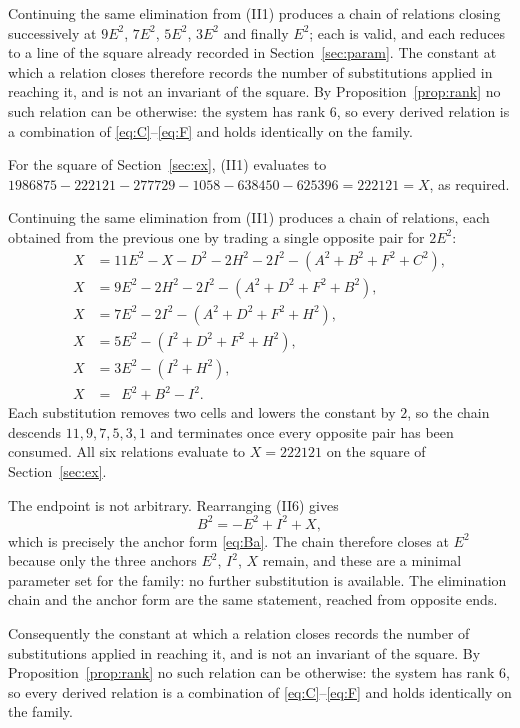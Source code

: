 \documentclass[12pt]{article}
\theoremstyle{remark}
\begin{document}
Continuing the same elimination from (II1) produces a chain of
relations closing successively at $9E^2$, $7E^2$, $5E^2$, $3E^2$ and
finally $E^2$; each is valid, and each reduces to a line of the square
already recorded in Section~\ref{sec:param}. The constant at which a
relation closes therefore records the number of substitutions applied
in reaching it, and is not an invariant of the square. By
Proposition~\ref{prop:rank} no such relation can be otherwise: the
system has rank $6$, so every derived relation is a combination of
\eqref{eq:C}--\eqref{eq:F} and holds identically on the family.

For the square of Section~\ref{sec:ex}, (II1) evaluates to
$1986875 - 222121 - 277729 - 1058 - 638450 - 625396 = 222121 = X$,
as required.

Continuing the same elimination from (II1) produces a chain of
relations, each obtained from the previous one by trading a single
opposite pair for $2E^2$:
\begin{align}
X &= 11E^2 - X - D^2 - 2H^2 - 2I^2 - (A^2 + B^2 + F^2 + C^2),
   \tag{II1}\\
X &= 9E^2 - 2H^2 - 2I^2 - (A^2 + D^2 + F^2 + B^2), \tag{II2}\\
X &= 7E^2 - 2I^2 - (A^2 + D^2 + F^2 + H^2), \tag{II3}\\
X &= 5E^2 - (I^2 + D^2 + F^2 + H^2), \tag{II4}\\
X &= 3E^2 - (I^2 + H^2), \tag{II5}\\
X &= \phantom{1}E^2 + B^2 - I^2. \tag{II6}
\end{align}
Each substitution removes two cells and lowers the constant by $2$,
so the chain descends $11, 9, 7, 5, 3, 1$ and terminates once every
opposite pair has been consumed. All six relations evaluate to
$X = 222121$ on the square of Section~\ref{sec:ex}.

The endpoint is not arbitrary. Rearranging (II6) gives
\[
B^2 = -E^2 + I^2 + X,
\]
which is precisely the anchor form \eqref{eq:Ba}. The chain therefore
closes at $E^2$ because only the three anchors $E^2$, $I^2$, $X$
remain, and these are a minimal parameter set for the family: no
further substitution is available. The elimination chain and the anchor
form are the same statement, reached from opposite ends.

Consequently the constant at which a relation closes records the number
of substitutions applied in reaching it, and is not an invariant of the
square. By Proposition~\ref{prop:rank} no such relation can be
otherwise: the system has rank $6$, so every derived relation is a
combination of \eqref{eq:C}--\eqref{eq:F} and holds identically on the
family.
\end{document}
